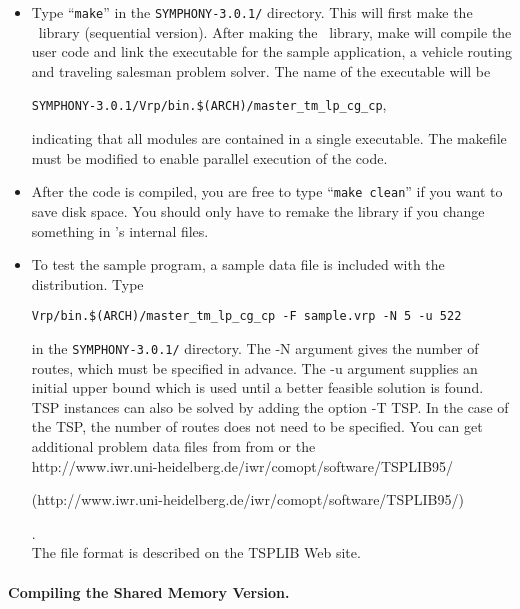 \begin{itemize}
        \item Type ``{\tt make}'' in the {\tt SYMPHONY-3.0.1/} directory. This will
first make the \BB\ library (sequential version). After making the \BB\
library, make will compile the user code and link the executable for the
sample application, a vehicle routing and traveling salesman problem
solver. The name of the executable will be 
\begin{center}
{\tt SYMPHONY-3.0.1/Vrp/bin.\$(ARCH)/master\_tm\_lp\_cg\_cp}, 
\end{center}
indicating that all
modules are contained in a single executable. The makefile must be modified to
enable parallel execution of the code.

\item After the code is compiled, you are free to type ``{\tt make
        clean}'' if you want to save disk space. You
        should only have to remake the library if you change something
        in \BB's internal files.

\item To test the sample program, a sample data file is included with the
distribution. Type 
\begin{center}
{\tt Vrp/bin.\$(ARCH)/master\_tm\_lp\_cg\_cp -F sample.vrp
-N 5 -u 522} 
\end{center}
in the {\tt SYMPHONY-3.0.1/} directory. The -N argument gives the number
of routes, which must be specified in advance. The -u argument supplies an
initial upper bound which is used until a better feasible solution is
found. TSP instances can also be solved by adding the option -T TSP. In the
case of the TSP, the number of routes does not need to be specified. You can
get additional problem data files from from  or the
\\ 
{http://www.iwr.uni-heidelberg.de/iwr/comopt/software/TSPLIB95/}
\begin{latexonly}
        (http://www.iwr.uni-heidelberg.de/iwr/comopt/software/TSPLIB95/)
\end{latexonly}. \\
The file
format is described on the TSPLIB Web site.
\end{itemize}

\paragraph{Compiling the Shared Memory Version.}

